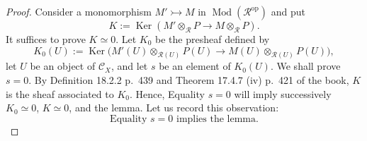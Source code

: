 \documentclass[12pt]{article}
\theoremstyle{remark}
\theoremstyle{definition}
\newcommand{\cc}{\mathcal}
\newcommand{\C}{\mathcal C}
\newcommand{\mono}{\rightarrowtail}
\DeclareMathOperator{\Ker}{Ker}
\DeclareMathOperator{\Mod}{Mod}
\DeclareMathOperator{\op}{op}
\begin{document}
\begin{proof}
Consider a monomorphism $M'\mono M$ in $\Mod(\cc R^{\op})$ and put 
$$ 
K:=\Ker(M'\otimes_{\cc R}P\to M\otimes_{\cc R}P).
$$ 
It suffices to prove $K\simeq0$. Let $K_0$ be the presheaf defined by 
$$
K_0(U):=\Ker\Big(M'(U)\otimes_{\cc R(U)}P(U)\to M(U)\otimes_{\cc R(U)}P(U)\Big),
$$ 
let $U$ be an object of $\C_X$, and let $s$ be an element of $K_0(U)$. We shall prove $s=0$. By Definition 18.2.2 p.~439 and Theorem 17.4.7 (iv) p.~421 of the book, $K$ is the sheaf associated to $K_0$. Hence, Equality $s=0$ will imply successively $K_0\simeq0$, $K\simeq0$, and the lemma. Let us record this observation: 
%
\begin{equation}\label{s=0il}
\text{Equality $s=0$ implies the lemma.}
\end{equation} 


\end{proof}
\end{document}
